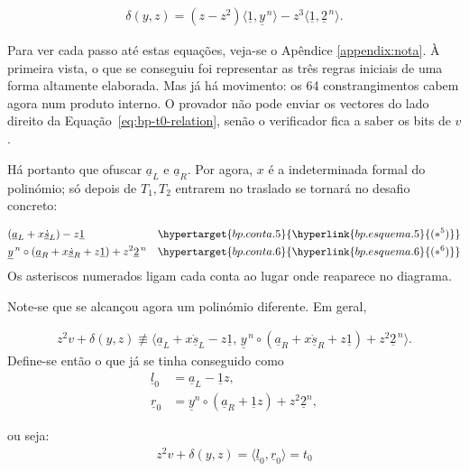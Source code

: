 \begin{align*}
\delta(y,z)=(z-z^2)\langle\underline1,\underline y^{\,n}\rangle
 -z^3\langle\underline1,\underline2^{\,n}\rangle.
\end{align*}

Para ver cada passo até estas equações, veja-se o Apêndice
\ref{appendix:nota}. À primeira vista, o que se conseguiu foi representar as
três regras iniciais de uma forma altamente elaborada. Mas já há movimento: os
64 constrangimentos cabem agora num produto interno. O provador não pode enviar
os vectores do lado direito da Equação~\eqref{eq:bp-t0-relation}, senão o
verificador fica a saber os bits de \(v\).

\newcommand{\bpmarca}[1]{\ensuremath{(\ast^{#1})}}
\newcommand{\bpconta}[1]{\hypertarget{bp.conta.#1}{\hyperlink{bp.esquema.#1}{\bpmarca{#1}}}}
\newcommand{\bpesquema}[1]{\hypertarget{bp.esquema.#1}{\hyperlink{bp.conta.#1}{\bpmarca{#1}}}}
Há portanto que ofuscar \(\underline a_L\) e \(\underline a_R\). Por agora,
\(x\) é a indeterminada formal do polinómio; só depois de \(T_1,T_2\) entrarem
no traslado se tornará no desafio concreto:

\begin{equation*}
\begin{aligned}
&(\underline{a}_L+x\underline{\dot{s}}_L)-z\underline1
 &&\bpconta{5}\\
&\underline{y}^{\,n}\circ
(\underline{a}_R+x\underline{\dot{s}}_R+z\underline1)
+z^2\underline{2}^{\,n}
 &&\bpconta{6}
\end{aligned}
\end{equation*}
Os asteriscos numerados ligam cada conta ao lugar onde reaparece no diagrama.

Note-se que se alcançou agora um polinómio diferente. Em geral,

\begin{align*}
z^2v+\delta(y,z)\not\equiv
\langle\underline a_L+x\underline{\dot s}_L-z\underline1,\,
\underline y^{\,n}\circ
(\underline a_R+x\underline{\dot s}_R+z\underline1)
+z^2\underline2^{\,n}\rangle .
\end{align*}
\medskip
Define-se então o que já se tinha conseguido como
\begin{align*}
\underline{l}_0 &= \underline{a}_L - \underline{1}z,\\
\underline{r}_0 &= \underline{y}^n \circ (\underline{a}_R + \underline{1}z) + z^2 \underline{2}^n,
\end{align*}

ou seja:
\begin{align*}
z^2 v + \delta(y,z) = \langle \underline{l}_0, \underline{r}_0 \rangle = t_0
\end{align*}

